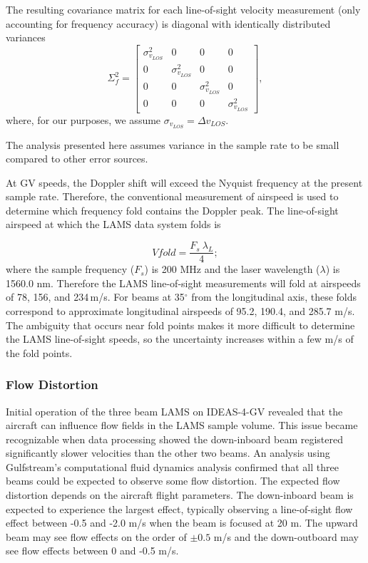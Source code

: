 \documentclass[12pt,twoside,english]{article}\usepackage[]{graphicx}\usepackage[]{color}
\let\OrgIndex\index
\renewcommand*{\index}[1]{\OrgIndex{#1}}
\begin{document}
{{The resulting covariance matrix for each line-of-sight velocity measurement (only accounting for frequency accuracy) is diagonal with identically distributed variances  
\begin{equation}
\Sigma_{f}^{2}=\left[\begin{array}{cccc} 
\sigma_{v_{LOS}}^{2} & 0 & 0 & 0\\ 0 & \sigma_{v_{LOS}}^{2} & 0 & 0\\ 0 & 0 & \sigma_{v_{LOS}}^{2} & 0\\ 0 & 0 & 0 & \sigma_{v_{LOS}}^{2} \end{array}\right],\label{CovFreq} 
\end{equation}
where, for our purposes, we assume $\sigma_{v_{LOS}}=\Delta v_{LOS}$. 

The analysis presented here assumes variance in the sample rate to be small compared to other error sources. 

At GV speeds, the Doppler shift will exceed the Nyquist frequency at the present sample rate. Therefore, the conventional measurement of airspeed is used
to determine which frequency fold contains the Doppler peak. The line-of-sight airspeed
at which the LAMS data system folds is

\begin{equation}
V{fold} = \frac{F_s~\lambda_L}{4}; %
\end{equation}
where the sample frequency ($F_s$) is 200 MHz and the laser wavelength ($\lambda$) is 1560.0 nm.  
Therefore the LAMS line-of-sight measurements will fold at airspeeds of 78,
156, and 234\,m/s. For beams at 35$^{\circ}$ from the longitudinal axis, these 
folds correspond to approximate longitudinal airspeeds of 95.2, 190.4, and 
285.7 m/s.
The ambiguity that occurs near fold points makes it more difficult to 
determine the LAMS line-of-sight speeds,
so the uncertainty increases within a few m/s of the fold points.

\subsubsection{Flow Distortion}

Initial operation of the three beam  LAMS on IDEAS-4-GV revealed that the aircraft can influence flow fields in the LAMS sample volume. This issue became recognizable when data processing showed the down-inboard beam registered significantly slower velocities than the other two beams. An analysis using Gulfstream's computational fluid dynamics analysis confirmed that all three beams could be expected to observe some flow distortion. The expected flow distortion depends on the aircraft flight parameters. The down-inboard beam is expected to experience the largest effect, typically observing a line-of-sight flow effect between -0.5 and -2.0 m/s when the beam is focused at 20 m. The upward beam may see flow effects on the order of $\pm0.5$ m/s and the down-outboard may see flow effects between 0 and -0.5 m/s. 

}}
\end{document}
